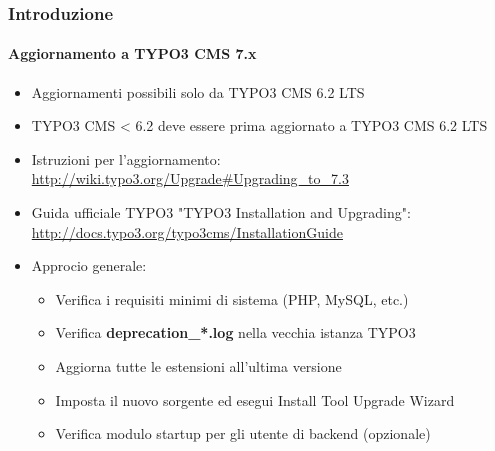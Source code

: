 \begin{frame}[fragile]
	\frametitle{Introduzione}
	\framesubtitle{Aggiornamento a TYPO3 CMS 7.x}

	\begin{itemize}
		\item Aggiornamenti possibili solo da TYPO3 CMS 6.2 LTS
		\item TYPO3 CMS < 6.2 deve essere prima aggiornato a TYPO3 CMS 6.2 LTS
	\end{itemize}

	\begin{itemize}

		\item Istruzioni per l'aggiornamento:\newline
			\smaller\url{http://wiki.typo3.org/Upgrade#Upgrading_to_7.3}\normalsize
		\item Guida ufficiale TYPO3 "TYPO3 Installation and Upgrading":
			\smaller\url{http://docs.typo3.org/typo3cms/InstallationGuide}\normalsize
		\item Approcio generale:
			\begin{itemize}
				\item Verifica i requisiti minimi di sistema \small(PHP, MySQL, etc.)
				\item Verifica \textbf{deprecation\_*.log} nella vecchia istanza TYPO3
				\item Aggiorna tutte le estensioni all'ultima versione
				\item Imposta il nuovo sorgente ed esegui Install Tool \textrightarrow Upgrade Wizard
				\item Verifica modulo startup per gli utente di backend (opzionale)
			\end{itemize}
	\end{itemize}

\end{frame}

